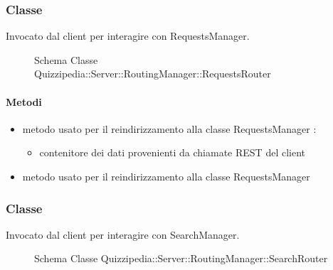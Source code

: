 \subsubsection{Classe }
Invocato dal client per interagire con RequestsManager.
\begin{figure}[H]
\centering
\noindent{}
\caption[Schema Classe RequestsRouter]{Schema Classe Quizzipedia::Server::RoutingManager::RequestsRouter}
\end{figure}
\paragraph{Metodi}
\begin{itemize}
\item {}
\newline
metodo usato per il reindirizzamento alla classe RequestsManager
\newline
{} :
\begin{itemize}
\item {}
\newline
contenitore dei dati provenienti da chiamate REST del client
\end{itemize}
\item {}
\newline
metodo usato per il reindirizzamento alla classe RequestsManager
\newline
\end{itemize}
\subsubsection{Classe }
Invocato dal client per interagire con SearchManager.
\begin{figure}[H]
\centering
\noindent{}
\caption[Schema Classe SearchRouter]{Schema Classe Quizzipedia::Server::RoutingManager::SearchRouter}
\end{figure}
